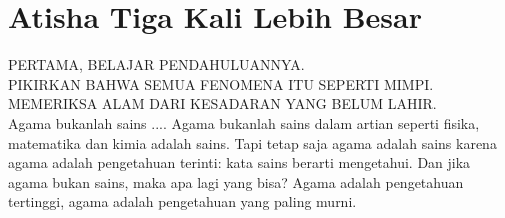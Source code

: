 \chapter{Atisha Tiga Kali Lebih Besar}

PERTAMA, BELAJAR PENDAHULUANNYA. \\
PIKIRKAN BAHWA SEMUA FENOMENA ITU SEPERTI MIMPI. \\
MEMERIKSA ALAM DARI KESADARAN YANG BELUM LAHIR. \\

Agama bukanlah sains .... Agama bukanlah sains dalam artian seperti fisika, matematika dan kimia adalah sains. Tapi tetap saja agama adalah sains karena agama adalah pengetahuan terinti: kata sains berarti mengetahui. Dan jika agama bukan sains, maka apa lagi yang bisa? Agama adalah pengetahuan tertinggi, agama adalah pengetahuan yang paling murni.

